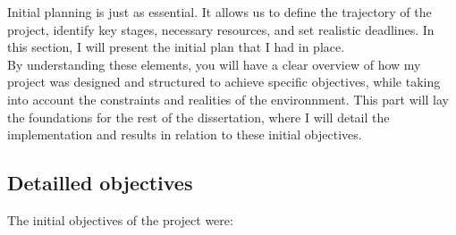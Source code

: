 \documentclass[a4paper, 12pt, french]{article}
\begin{document}
				Initial planning is just as essential. It allows us to define the trajectory of the project, identify key stages, necessary resources, and set realistic deadlines. In this section, I will present the initial plan that I had in place.\\

				By understanding these elements, you will have a clear overview of how my project was designed and structured to achieve specific objectives, while taking into account the constraints and realities of the environnment. This part will lay the foundations for the rest of the dissertation, where I will detail the implementation and results in relation to these initial objectives.
				\newpage
				\subsection{Detailled objectives}
				\noindent The initial objectives of the project were:
	
\end{document}
